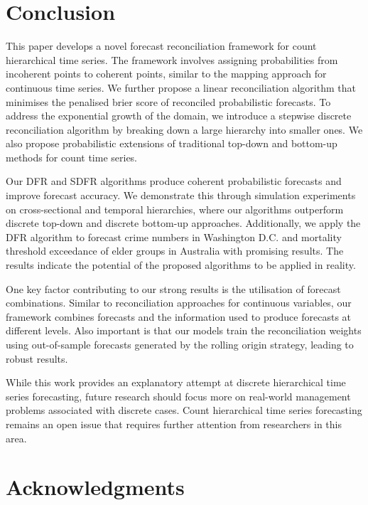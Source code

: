 \documentclass[a4paper,review,12pt,authoryear]{elsarticle}
\theoremstyle{definition}
\begin{document}
     \section{Conclusion}
     \label{sec:conclusion}

     This paper develops a novel forecast reconciliation framework for count hierarchical time series.
     The framework involves assigning probabilities from incoherent points to coherent points, similar to the mapping approach for continuous time series.
     We further propose a linear reconciliation algorithm that minimises the penalised brier score of reconciled probabilistic forecasts.
     To address the exponential growth of the domain, we introduce a stepwise discrete reconciliation algorithm by breaking down a large hierarchy into smaller ones.
     We also propose probabilistic extensions of traditional top-down and bottom-up methods for count time series.

     Our DFR and SDFR algorithms produce coherent probabilistic forecasts and improve forecast accuracy.
     We demonstrate this through simulation experiments on cross-sectional and temporal hierarchies, where our algorithms outperform discrete top-down and discrete bottom-up approaches. Additionally, we apply the DFR algorithm to forecast crime numbers in Washington D.C. and mortality threshold exceedance of elder groups in Australia with promising results.
     The results indicate the potential of the proposed algorithms to be applied in reality.

     One key factor contributing to our strong results is the utilisation of forecast combinations.
     Similar to reconciliation approaches for continuous variables, our framework combines forecasts and the information used to produce forecasts at different levels.
     Also important is that our models train the reconciliation weights using out-of-sample forecasts generated by the rolling origin strategy, leading to robust results.


     While this work provides an explanatory attempt at discrete hierarchical time series forecasting, future research should focus more on real-world management problems associated with discrete cases. Count hierarchical time series forecasting remains an open issue that requires further attention from researchers in this area.

\section*{Acknowledgments}
\end{document}
